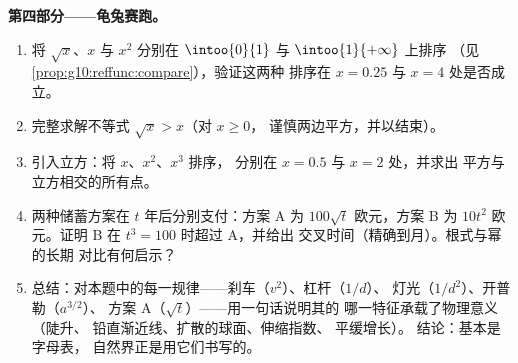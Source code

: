 \begin{problem}
\medskip
\noindent\textbf{第四部分——龟兔赛跑。}
\begin{enumerate}[resume]
  \item 将 $\sqrt x$、$x$ 与 $x^2$ 分别在 $\intoo{0}{1}$
        与 $\intoo{1}{+\infty}$ 上排序
        （见\cref{prop:g10:reffunc:compare}），验证这两种
        排序在 $x = 0.25$ 与 $x = 4$ 处是否成立。
  \item 完整求解不等式 $\sqrt x > x$（对 $x \geq 0$，
        谨慎两边平方，并以结束）。
  \item 引入立方：将 $x$、$x^2$、$x^3$ 排序，
        分别在 $x = 0.5$ 与 $x = 2$ 处，并求出
        平方与立方相交的所有点。
  \item 两种储蓄方案在 $t$ 年后分别支付：方案 A 为 $100\sqrt t$
        欧元，方案 B 为 $10 t^2$ 欧元。证明 B 在 $t^3 = 100$
        时超过 A，并给出
        交叉时间（精确到月）。根式与幂的长期
        对比有何启示？
  \item 总结：对本题中的每一规律——刹车（$v^2$）、杠杆（$1/d$）、
        灯光（$1/d^2$）、开普勒（$a^{3/2}$）、
        方案 A（$\sqrt t$）——用一句话说明其的
        哪一特征承载了物理意义（陡升、
        铅直渐近线、扩散的球面、伸缩指数、
        平缓增长）。
        结论：基本是字母表，
        自然界正是用它们书写的。
\end{enumerate}
\end{problem}
